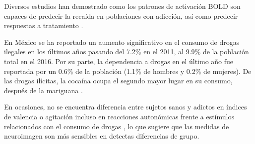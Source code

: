 Diversos estudios han demostrado como los patrones de activación BOLD son capaces de predecir la recaída en poblaciones con adicción, así como predecir respuestas a tratamiento \parencite{Suckling2017}.

En México se ha reportado un aumento significativo en el consumo de drogas ilegales en los últimos años pasando del 7.2\% en el 2011, al 9.9\% de la población total en el 2016.
Por su parte, la dependencia a drogas en el último año fue reportada por un 0.6\% de la población (1.1\% de hombres y 0.2\% de mujeres).
De las drogas ilícitas, la cocaína ocupa el segundo mayor lugar en su consumo, después de la mariguana \parencite{Villatoro-Velazques2017}.

En ocasiones, no se encuentra diferencia entre sujetos sanos y adictos en índices de valencia o agitación \textemdash{}incluso en reacciones autonómicas\textemdash{} frente a estímulos relacionados con el consumo de drogas \parencite{Goldstein2012a}, lo que sugiere que las medidas de neuroimagen son más sensibles en detectas diferencias de grupo.
